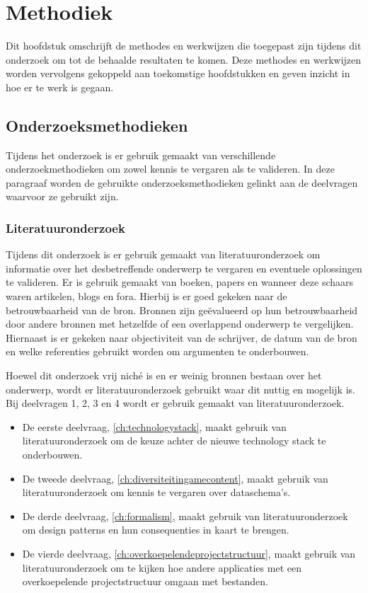\chapter{Methodiek}
\label{ch:methodes}
Dit hoofdstuk omschrijft de methodes en werkwijzen die toegepast zijn tijdens dit onderzoek om tot de behaalde resultaten te komen. Deze methodes en werkwijzen worden vervolgens gekoppeld aan toekomstige hoofdstukken en geven inzicht in hoe er te werk is gegaan.

\section{Onderzoeksmethodieken}
Tijdens het onderzoek is er gebruik gemaakt van verschillende onderzoekmethodieken om zowel kennis te vergaren als te valideren. In deze paragraaf worden de gebruikte onderzoeksmethodieken gelinkt aan de deelvragen waarvoor ze gebruikt zijn.

\subsection{Literatuuronderzoek}
Tijdens dit onderzoek is er gebruik gemaakt van literatuuronderzoek om informatie over het desbetreffende onderwerp te vergaren en eventuele oplossingen te valideren. Er is gebruik gemaakt van boeken, papers en wanneer deze schaars waren artikelen, blogs en fora. Hierbij is er goed gekeken naar de betrouwbaarheid van de bron. Bronnen zijn geëvalueerd op hun betrouwbaarheid door andere bronnen met hetzelfde of een overlappend onderwerp te vergelijken. Hiernaast is er gekeken naar objectiviteit van de schrijver, de datum van de bron en welke referenties gebruikt worden om argumenten te onderbouwen.

Hoewel dit onderzoek vrij niché is en er weinig bronnen bestaan over het onderwerp, wordt er literatuuronderzoek gebruikt waar dit nuttig en mogelijk is. Bij deelvragen 1, 2, 3 en 4 wordt er gebruik gemaakt van literatuuronderzoek.

\begin{itemize}
    \item De eerste deelvraag, \autoref{ch:technologystack}, maakt gebruik van literatuuronderzoek om de keuze achter de nieuwe technology stack te onderbouwen.
    \item De tweede deelvraag, \autoref{ch:diversiteitingamecontent}, maakt gebruik van literatuuronderzoek om kennis te vergaren over dataschema’s.
    \item De derde deelvraag, \autoref{ch:formalism}, maakt gebruik van literatuuronderzoek om design patterns en hun consequenties in kaart te brengen.
    \item De vierde deelvraag, \autoref{ch:overkoepelendeprojectstructuur}, maakt gebruik van literatuuronderzoek om te kijken hoe andere applicaties met een overkoepelende projectstructuur omgaan met bestanden.
\end{itemize}

